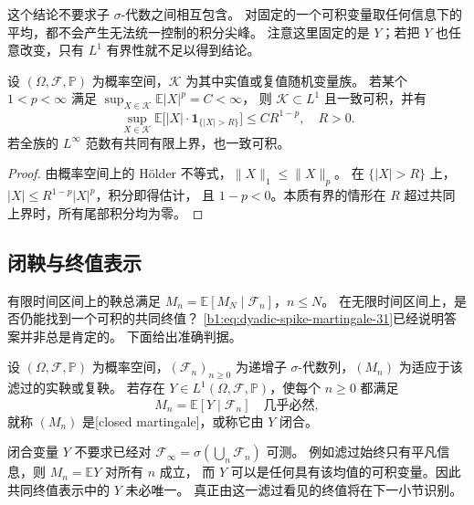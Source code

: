 这个结论不要求子 \(\sigma\)-代数之间相互包含。
对固定的一个可积变量取任何信息下的平均，都不会产生无法统一控制的积分尖峰。
注意这里固定的是 \(Y\)；若把 \(Y\) 也任意改变，只有 \(L^1\) 有界性就不足以得到结论。

\begin{proposition}[较高阶矩给出一致可积性]
\label{b1:prop:lp-ui-31}
设 \((\Omega,\mathcal F,\mathbb P)\) 为概率空间，\(\mathcal K\) 为其中实值或复值随机变量族。
若某个 \(1<p<\infty\) 满足 \(\sup_{X\in\mathcal K}\mathbb E|X|^p=C<\infty\)，
则 \(\mathcal K\subset L^1\) 且一致可积，并有
\[
 \sup_{X\in\mathcal K}\mathbb E\bigl[|X|\cdot\mathbf1_{\{|X|>R\}}\bigr]
 \leq C R^{1-p},\quad R>0.
\]
若全族的 \(L^\infty\) 范数有共同有限上界，也一致可积。
\end{proposition}
\begin{proof}
由概率空间上的 Hölder 不等式，\(\|X\|_1\leq\|X\|_p\)。
在 \(\{|X|>R\}\) 上，\(|X|\leq R^{1-p}|X|^p\)，积分即得估计，
且 \(1-p<0\)。本质有界的情形在 \(R\) 超过共同上界时，所有尾部积分均为零。
\end{proof}

\subsection{闭鞅与终值表示}
\label{b1:subsec:310602}

有限时间区间上的鞅总满足 \(M_n=\mathbb E[M_N\mid\mathcal F_n]\)，\(n\leq N\)。
在无限时间区间上，是否仍能找到一个可积的共同终值？
\eqref{b1:eq:dyadic-spike-martingale-31}已经说明答案并非总是肯定的。
下面给出准确判据。

\begin{definition}[闭鞅]
\label{b1:def:closed-martingale-31}
设 \((\Omega,\mathcal F,\mathbb P)\) 为概率空间，\((\mathcal F_n)_{n\geq0}\)
为递增子 \(\sigma\)-代数列，\((M_n)\) 为适应于该滤过的实鞅或复鞅。
若存在 \(Y\in L^1(\Omega,\mathcal F,\mathbb P)\)，使每个 \(n\geq0\) 都满足
\[
 M_n=\mathbb E[Y\mid\mathcal F_n]\quad\text{几乎必然},
\]
就称 \((M_n)\) 是[closed martingale]，或称它由 \(Y\) 闭合。
\end{definition}

闭合变量 \(Y\) 不要求已经对 \(\mathcal F_\infty=\sigma(\bigcup_n\mathcal F_n)\) 可测。
例如滤过始终只有平凡信息，则 \(M_n=\mathbb E Y\) 对所有 \(n\) 成立，
而 \(Y\) 可以是任何具有该均值的可积变量。因此共同终值表示中的 \(Y\) 未必唯一。
真正由这一滤过看见的终值将在下一小节识别。

